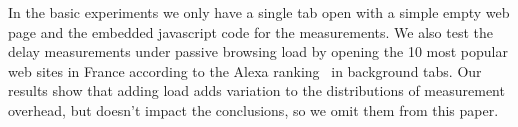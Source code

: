 \documentclass[12pt,twoside]{book}
\begin{document}
In the basic experiments we only have a single tab open with a simple empty web page and the embedded javascript code for the measurements. We also test the delay measurements under passive browsing load by opening the 10 most popular web sites in France according to the Alexa ranking~\cite{alexa_top_france} in background tabs. Our results show that adding load adds 
variation to the distributions of measurement overhead, but doesn't impact the conclusions, so we omit them from this paper.

%
\end{document}
